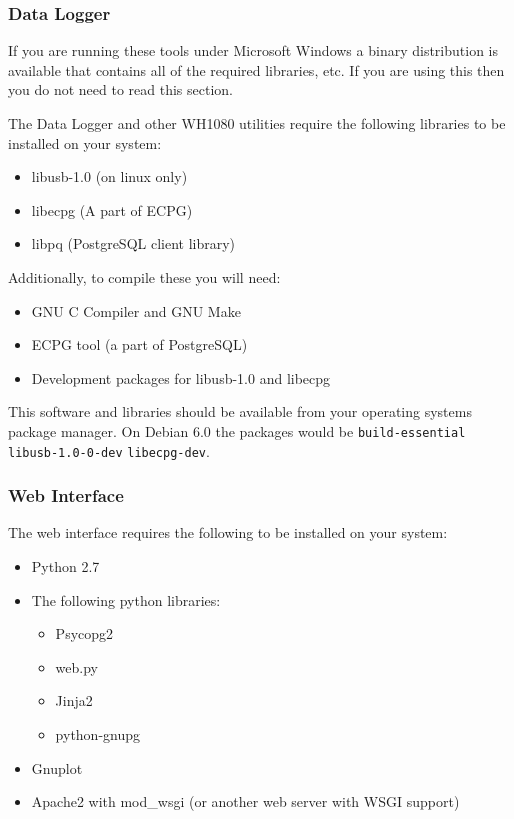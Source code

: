 \documentclass[a4paper,10pt,draft]{book}
\begin{document}
\subsubsection{Data Logger}

If you are running these tools under Microsoft Windows a binary distribution is available that contains all of the required libraries, etc. If you are using this then you do not need to read this section.

The Data Logger and other WH1080 utilities require the following libraries to be installed on your system:
\begin{itemize}
\item libusb-1.0 (on linux only)
\item libecpg (A part of ECPG)
\item libpq (PostgreSQL client library)
\end{itemize}

Additionally, to compile these you will need:
\begin{itemize}
\item GNU C Compiler and GNU Make
\item ECPG tool (a part of PostgreSQL)
\item Development packages for libusb-1.0 and libecpg
\end{itemize}

This software and libraries should be available from your operating systems package manager. On Debian 6.0 the packages would be \verb|build-essential| \verb|libusb-1.0-0-dev| \verb|libecpg-dev|.

\subsubsection{Web Interface}
The web interface requires the following to be installed on your system:
\begin{itemize}
\item Python 2.7
\item The following python libraries: 
\begin{itemize}
\item Psycopg2
\item web.py
\item Jinja2
\item python-gnupg
\end{itemize}
\item Gnuplot
\item Apache2 with mod\_wsgi (or another web server with WSGI support)
\end{itemize}
\end{document}
